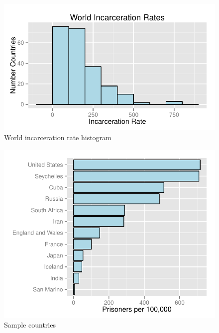 \documentclass[letterpaper, landscape]{article}
\begin{document}
  \begin{figure}[H]
    \centering
    \includegraphics[scale = 0.8]{figures/world_histogram.pdf}
    \caption{World incarceration rate histogram}
  \end{figure}

  \begin{figure}[H]
    \centering
    \includegraphics[scale = 0.8]{figures/sample_world_rates.pdf}
    \caption{Sample countries}
  \end{figure}
\end{document}
